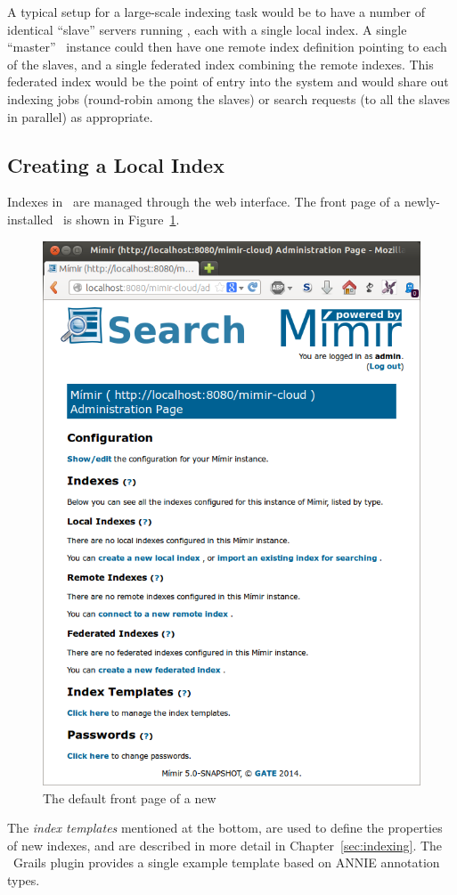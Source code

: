A typical setup for a large-scale indexing task would be to have a number of
identical ``slave'' servers running \Mimir, each with a single local index.  A
single ``master'' \Mimir\ instance could then have one remote index definition
pointing to each of the slaves, and a single federated index combining the
remote indexes.  This federated index would be the point of entry into the
system and would share out indexing jobs (round-robin among the slaves) or
search requests (to all the slaves in parallel) as appropriate.

\subsection{Creating a Local Index}

Indexes in \Mimir\ are managed through the web interface.  The front page of a
newly-installed \Mimir\ is shown in Figure~\ref{fig:front-page}.
%
\begin{figure}[htb!]
\begin{center}
\includegraphics[scale=0.5]{img/default-front-page}
\end{center}
\caption{The default front page of a new \Mimir}
\label{fig:front-page}
\end{figure}
%
The {\em index templates} mentioned at the bottom, are used to define the
properties of new indexes, and are described in more detail in
Chapter~\ref{sec:indexing}.  The \Mimir\ Grails plugin provides a single
example template based on ANNIE annotation types.

